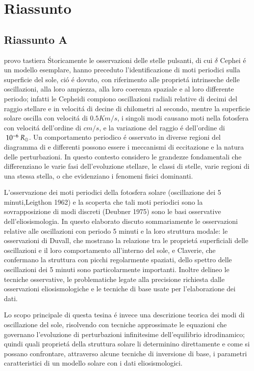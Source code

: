 \documentclass[../main.tex]{subfiles}
\begin{document}
\chapter{Riassunto}
\PartialToc

\section{Riassunto A}
provo tastiera \'
Storicamente le osservazioni delle stelle pulsanti, di cui $\delta$ Cephei \'e un modello esemplare, hanno preceduto l'identificazione di moti periodici sulla superficie del sole, ci\'o \'e dovuto, con riferimento alle propriet\'a intrinseche delle oscillazioni, alla loro ampiezza, alla loro coerenza spaziale e al loro differente periodo; infatti le Cepheidi compiono oscillazioni radiali relative di decimi del raggio stellare e in velocit\'a di decine di chilometri al secondo, mentre la superficie solare oscilla con velocit\'a di $0.5 Km/s$, i singoli modi causano moti nella fotosfera con velocit\'a dell'ordine di $cm/s$, e la variazione del raggio \'e dell'ordine di $\ 10^{-6}\ R_{\odot}$. Un comportamento periodico \'e osservato in diverse regioni del diagramma di \hr{} e differenti possono essere i meccanismi di eccitazione e la natura delle perturbazioni. In questo contesto considero le grandezze fondamentali che differenziano le varie fasi dell'evoluzione stellare, le classi di stelle, varie regioni di una stessa stella, o che evidenziano i fenomeni fisici dominanti.

L'osservazione dei moti periodici della fotosfera solare (oscillazione dei 5 minuti,Leigthon 1962) e la scoperta che tali moti periodici sono la sovrapposizione di modi discreti (Deubner 1975) sono le basi osservative dell'eliosismologia. In questo elaborato discuto sommariamente le osservazioni relative  alle oscillazioni con periodo 5 minuti e la loro struttura modale: le osservazioni di Duvall, che mostrano la relazione tra le propriet\'a superficiali delle oscillazioni e il loro comportamento all'interno del sole, e Claverie, che confermano la struttura con picchi regolarmente spaziati, dello spettro delle oscillazioni dei 5 minuti sono particolarmente importanti. Inoltre delineo le tecniche osservative, le problematiche legate alla precisione richiesta dalle osservazioni eliosismologiche e le tecniche di base usate per l'elaborazione dei dati.

Lo scopo principale di questa tesina \'e invece una descrizione teorica dei modi di oscillazione del sole, risolvendo con tecniche approssimate le equazioni che governano l'evoluzione di perturbazioni infinitesime dell'equilibrio idrodinamico; quindi quali propriet\'a della struttura solare li determinino direttamente e come si possano confrontare, attraverso alcune tecniche di inversione di base, i parametri caratteristici di un modello solare con i dati eliosismologici.
\end{document}
